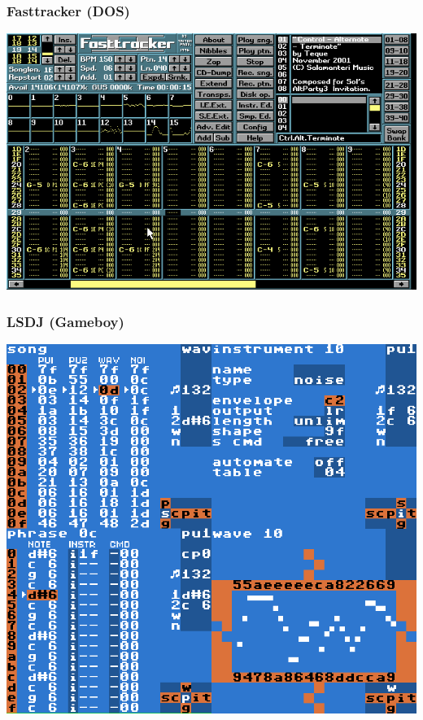 \documentclass{beamer}
\begin{document}
\begin{frame}
\frametitle{Fasttracker (DOS)}
\begin{center}
\includegraphics[scale=0.4]{fasttracker}
\end{center}
\end{frame}

\begin{frame}
\frametitle{LSDJ (Gameboy)}
\begin{center}
\includegraphics[scale=0.2]{lsdj}
\end{center}
\end{frame}
\end{document}

